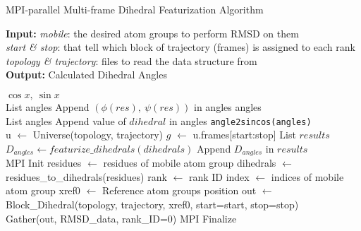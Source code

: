 \begin{algorithm}[ht!]
	\scriptsize
	\caption{MPI-parallel Multi-frame Dihedral Featurization Algorithm}
	\label{alg:Dihedral}
	\hspace*{\algorithmicindent} \textbf{Input:} \emph{mobile}: the desired atom groups to perform RMSD on them \\ 
	\hspace*{\algorithmicindent} \emph{start \& stop}: that tell which block of trajectory (frames) is assigned to each rank \\
	\hspace*{\algorithmicindent} \emph{topology \& trajectory}: files to read the data structure from \\
	\hspace*{\algorithmicindent} \textbf{Output:} Calculated Dihedral Angles
	\begin{algorithmic}[1]
		\State \Return $\cos{x},\: \sin{x}$
		\EndProcedure
		\\
		\State List angles
		\State Append $(\phi (res),\: \psi (res))$ in angles
		\EndFor
		\State \Return angles
		\EndProcedure
		\\
		\State List angles
		\State Append value of $dihedral$ in angles
		\EndFor
		\State \Return \texttt{angle2sincos(angles)}
		\EndProcedure
		\\
		\State u $\leftarrow$ Universe(topology, trajectory)
		\State $g$ $\leftarrow$ u.frames[start:stop]
		\State List $results$
		\State $D_{angles} \leftarrow featurize\_dihedrals(dihedrals)$
		\State Append $D_{angles}$ in $results$ 
		\EndFor
		\EndProcedure
		\\      
		\State MPI Init 
		\State residues $\leftarrow$ residues of mobile atom group
		\State dihedrals $\leftarrow$ residues\_to\_dihedrals(residues)
		\State rank $\leftarrow$ rank ID
		\State index $\leftarrow$ indices of mobile atom group
		\State xref0 $\leftarrow$ Reference atom group\textsc{}s position
		\State out $\leftarrow$ Block\_Dihedral(topology, trajectory, xref0, start=start, stop=stop)
		\\
		\State Gather(out, RMSD\_data, rank\_ID=0)
		\State MPI Finalize
	\end{algorithmic}
\end{algorithm}


